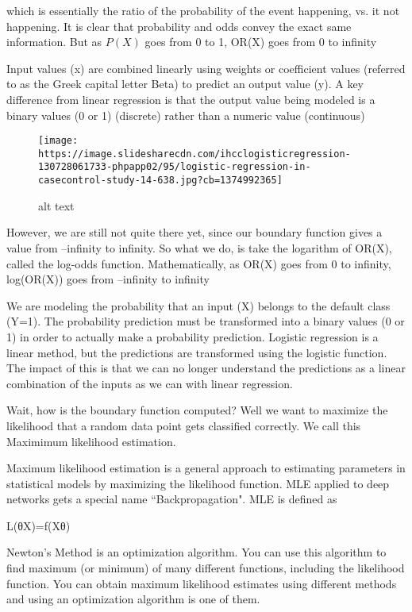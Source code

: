 \documentclass[11pt]{article}
\makeatletter
\def\maxwidth{\ifdim\Gin@nat@width>\linewidth\linewidth
    \else\Gin@nat@width\fi}
\let\Oldincludegraphics\includegraphics
\renewcommand{\includegraphics}[1]{\Oldincludegraphics[width=.8\maxwidth]{#1}}
\makeatother
\begin{document}
which is essentially the ratio of the probability of the event
happening, vs. it not happening. It is clear that probability and odds
convey the exact same information. But as \(P(X)\) goes from 0 to 1,
OR(X) goes from 0 to infinity

Input values (x) are combined linearly using weights or coefficient
values (referred to as the Greek capital letter Beta) to predict an
output value (y). A key difference from linear regression is that the
output value being modeled is a binary values (0 or 1) (discrete) rather
than a numeric value (continuous)

\begin{figure}
\centering
\texttt{[image: https://image.slidesharecdn.com/ihcclogisticregression-130728061733-phpapp02/95/logistic-regression-in-casecontrol-study-14-638.jpg?cb=1374992365]}
\caption{alt text}
\end{figure}

However, we are still not quite there yet, since our boundary function
gives a value from --infinity to infinity. So what we do, is take the
logarithm of OR(X), called the log-odds function. Mathematically, as
OR(X) goes from 0 to infinity, log(OR(X)) goes from --infinity to
infinity

We are modeling the probability that an input (X) belongs to the default
class (Y=1). The probability prediction must be transformed into a
binary values (0 or 1) in order to actually make a probability
prediction. Logistic regression is a linear method, but the predictions
are transformed using the logistic function. The impact of this is that
we can no longer understand the predictions as a linear combination of
the inputs as we can with linear regression.

Wait, how is the boundary function computed? Well we want to maximize
the likelihood that a random data point gets classified correctly. We
call this Maximimum likelihood estimation.

Maximum likelihood estimation is a general approach to estimating
parameters in statistical models by maximizing the likelihood function.
MLE applied to deep networks gets a special name ``Backpropagation". MLE
is defined as

L(θ\textbar{}X)=f(X\textbar{}θ)

Newton's Method is an optimization algorithm. You can use this algorithm
to find maximum (or minimum) of many different functions, including the
likelihood function. You can obtain maximum likelihood estimates using
different methods and using an optimization algorithm is one of them.
\end{document}
